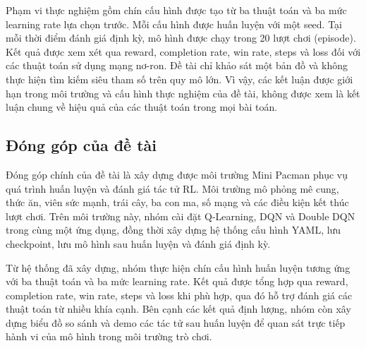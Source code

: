 Phạm vi thực nghiệm gồm chín cấu hình được tạo từ ba thuật toán và ba mức learning rate lựa chọn trước. Mỗi cấu hình được huấn luyện với một seed. Tại mỗi thời điểm đánh giá định kỳ, mô hình được chạy trong 20 lượt chơi (episode). Kết quả được xem xét qua reward, completion rate, win rate, steps và loss đối với các thuật toán sử dụng mạng nơ-ron. Đề tài chỉ khảo sát một bản đồ và không thực hiện tìm kiếm siêu tham số trên quy mô lớn. Vì vậy, các kết luận được giới hạn trong môi trường và cấu hình thực nghiệm của đề tài, không được xem là kết luận chung về hiệu quả của các thuật toán trong mọi bài toán.

\subsection{Đóng góp của đề tài}

Đóng góp chính của đề tài là xây dựng được môi trường Mini Pacman phục vụ quá trình huấn luyện và đánh giá tác tử RL. Môi trường mô phỏng mê cung, thức ăn, viên sức mạnh, trái cây, ba con ma, số mạng và các điều kiện kết thúc lượt chơi. Trên môi trường này, nhóm cài đặt Q-Learning, DQN và Double DQN trong cùng một ứng dụng, đồng thời xây dựng hệ thống cấu hình YAML, lưu checkpoint, lưu mô hình sau huấn luyện và đánh giá định kỳ.

Từ hệ thống đã xây dựng, nhóm thực hiện chín cấu hình huấn luyện tương ứng với ba thuật toán và ba mức learning rate. Kết quả được tổng hợp qua reward, completion rate, win rate, steps và loss khi phù hợp, qua đó hỗ trợ đánh giá các thuật toán từ nhiều khía cạnh. Bên cạnh các kết quả định lượng, nhóm còn xây dựng biểu đồ so sánh và demo các tác tử sau huấn luyện để quan sát trực tiếp hành vi của mô hình trong môi trường trò chơi.
